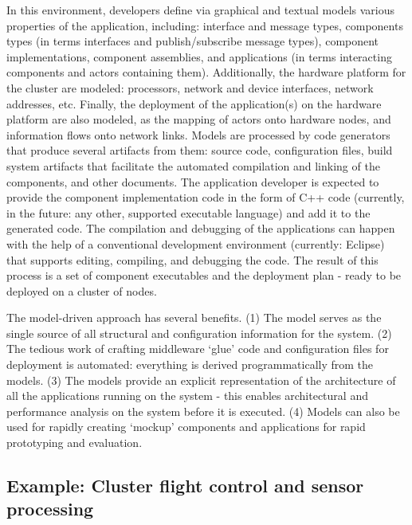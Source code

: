 In this environment, developers define via graphical and textual
models various properties of the application, including: interface and
message types, components types (in terms interfaces and
publish/subscribe message types), component implementations, component
assemblies, and applications (in terms interacting components and
actors containing them). Additionally, the hardware platform for the
cluster are modeled: processors, network and device interfaces,
network addresses, etc. Finally, the deployment of the application(s)
on the hardware platform are also modeled, as the mapping of actors onto
hardware nodes, and information flows onto network links. 
Models are processed by code generators
that produce several artifacts from them: source code, configuration
files, build system artifacts that facilitate the automated
compilation and linking of the components, and other documents. The
application developer is expected to provide the component
implementation code in the form of C++ code (currently, in the future:
any other, supported executable language) and add it to the generated
code. The compilation and debugging of the applications can happen
with the help of a conventional development environment
(currently: Eclipse) that supports editing, compiling, and debugging
the code.  The result of this process is a set of component
executables and the deployment plan - ready to be deployed on a
cluster of nodes.

The model-driven approach has several benefits. (1) The model serves
as the single source of all structural and configuration information
for the system. (2) The tedious work of crafting middleware `glue'
code and configuration files for deployment is automated: everything
is derived programmatically from the models. (3) The models provide an
explicit representation of the architecture of all the applications
running on the system - this enables architectural and performance
analysis on the system before it is executed. (4) Models can also be
used for rapidly creating `mockup' components and applications for
rapid prototyping and evaluation.

\subsection{Example: Cluster flight control and sensor processing}


